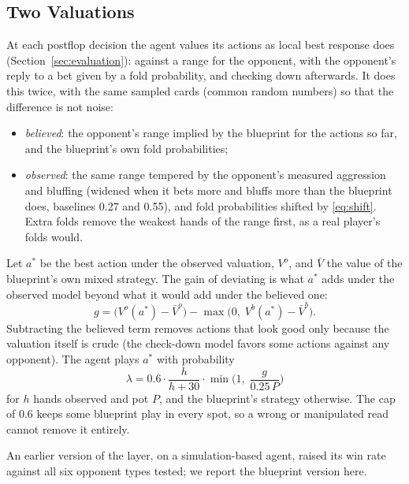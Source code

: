 \documentclass{ieeeaccess}
\begin{document}
\subsection{Two Valuations}
At each postflop decision the agent values its actions as local best response does
(Section~\ref{sec:evaluation}): against a range for the opponent, with the opponent's reply to a
bet given by a fold probability, and checking down afterwards. It does this twice, with the same
sampled cards (common random numbers) so that the difference is not noise:
\begin{itemize}
\item \emph{believed}: the opponent's range implied by the blueprint for the actions so far, and
the blueprint's own fold probabilities;
\item \emph{observed}: the same range tempered by the opponent's measured aggression and bluffing
(widened when it bets more and bluffs more than the blueprint does, baselines 0.27 and 0.55), and
fold probabilities shifted by \eqref{eq:shift}. Extra folds remove the weakest hands of the range
first, as a real player's folds would.
\end{itemize}
Let $a^\ast$ be the best action under the observed valuation, $V^{o}$, and $\bar V$ the value of
the blueprint's own mixed strategy. The gain of deviating is what $a^\ast$ adds under the
observed model beyond what it would add under the believed one:
\begin{equation}
g = \big(V^{o}(a^\ast) - \bar V^{o}\big) - \max\!\big(0,\; V^{b}(a^\ast) - \bar V^{b}\big).
\label{eq:gain}
\end{equation}
Subtracting the believed term removes actions that look good only because the valuation itself is
crude (the check-down model favors some actions against any opponent). The agent plays $a^\ast$
with probability
\begin{equation}
\lambda = 0.6 \cdot \frac{h}{h+30} \cdot \min\!\Big(1,\; \frac{g}{0.25\,P}\Big)
\label{eq:lambda}
\end{equation}
for $h$ hands observed and pot $P$, and the blueprint's strategy otherwise. The cap of 0.6 keeps
some blueprint play in every spot, so a wrong or manipulated read cannot remove it entirely.

An earlier version of the layer, on a simulation-based agent, raised its win rate against all
six opponent types tested; we report the blueprint version here.

\end{document}
